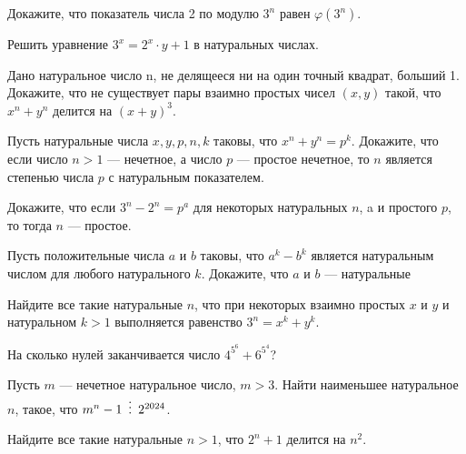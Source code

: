 \documentclass{article}
\begin{document}
\begin{enumerate_boxed}
        \item Докажите, что показатель числа 2 по модулю $3^n$ равен $\varphi(3^n)$.
        \item Решить уравнение $3^x = 2^x \cdot y + 1$ в натуральных числах.
        \item Дано натуральное число n, не делящееся ни на один точный квадрат, больший 1.
        Докажите, что не существует пары взаимно простых чисел $(x, y)$ такой, что $x^n + y^n$ делится на $(x + y)^3$.
        \item Пусть натуральные числа $x, y, p, n, k$ таковы, что $x^n +y^n = p^k$.
        Докажите, что если число $n > 1$ — нечетное, а число $p$ — простое нечетное, то $n$ является степенью числа $p$ с натуральным показателем.
        \item Докажите, что если $3^n - 2^n = p^a$ для некоторых натуральных $n$, a и простого $p$, то тогда $n$ — простое.
        \item Пусть положительные числа $a$ и $b$ таковы, что $a^k - b^k$ является натуральным числом для любого натурального $k$.
        Докажите, что $a$ и $b$ — натуральные
        \item Найдите все такие натуральные $n$, что при некоторых взаимно простых $x$ и $y$ и натуральном $k > 1$ выполняется равенство $3^n = x^k + y^k$.
        \item На сколько нулей заканчивается число $4^{5^6} + 6^{5^4}$?
        \item Пусть $m$ — нечетное натуральное число, $m > 3$.
        Найти наименьшее натуральное $n$, такое, что $m^n - 1 \,\,\,\vdots\,\,\, 2^{2024}$.
        \item Найдите все такие натуральные $n > 1$, что $2^n + 1$ делится на $n^2$.

    \end{enumerate_boxed}
\end{document}
